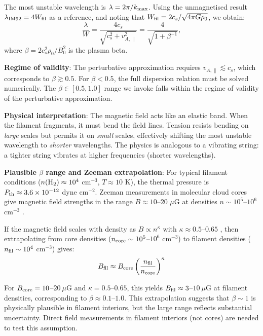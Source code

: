 \documentclass[11pt,a4paper]{article}
\begin{document}
The most unstable wavelength is $\lambda = 2\pi/k_{\rm max}$. Using the unmagnetised result $\lambda_{\rm IM92} = 4W_{\rm fil}$ as a reference, and noting that $W_{\rm fil} = 2c_s/\sqrt{4\pi G\rho_0}$, we obtain:
\begin{equation}
\frac{\lambda}{W} = \frac{4c_s}{\sqrt{c_s^2 + v_{A,\parallel}^2}} = \frac{4}{\sqrt{1 + \beta^{-1}}},
\label{eq:tension_lambda}
\end{equation}
where $\beta = 2c_s^2\rho_0/B_0^2$ is the plasma beta.

\textbf{Regime of validity}: The perturbative approximation requires $v_{A,\parallel} \lesssim c_s$, which corresponds to $\beta \gtrsim 0.5$. For $\beta < 0.5$, the full dispersion relation must be solved numerically. The $\beta \in [0.5, 1.0]$ range we invoke falls within the regime of validity of the perturbative approximation.

\textbf{Physical interpretation}: The magnetic field acts like an elastic band. When the filament fragments, it must bend the field lines. Tension resists bending on \textit{large} scales but permits it on \textit{small} scales, effectively shifting the most unstable wavelength to \textit{shorter} wavelengths. The physics is analogous to a vibrating string: a tighter string vibrates at higher frequencies (shorter wavelengths).

\textbf{Plausible $\beta$ range and Zeeman extrapolation}: For typical filament conditions ($n({\rm H_2}) \approx 10^4$ cm$^{-3}$, $T \approx 10$ K), the thermal pressure is $P_{\rm th} \approx 3.6 \times 10^{-12}$ dyne cm$^{-2}$. Zeeman measurements in molecular cloud cores give magnetic field strengths in the range $B \approx 10$--$20$ $\mu$G at densities $n \sim 10^5$--$10^6$ cm$^{-3}$ \citep{Crutcher2012}.

If the magnetic field scales with density as $B \propto n^{\kappa}$ with $\kappa \approx 0.5$--$0.65$ \citep{Crutcher2012}, then extrapolating from core densities ($n_{\rm core} \sim 10^5$--$10^6$ cm$^{-3}$) to filament densities ($n_{\rm fil} \sim 10^4$ cm$^{-3}$) gives:
\begin{equation}
B_{\rm fil} \approx B_{\rm core} \left(\frac{n_{\rm fil}}{n_{\rm core}}\right)^{\kappa}
\end{equation}

For $B_{\rm core} = 10$--$20~\mu$G and $\kappa = 0.5$--$0.65$, this yields $B_{\rm fil} \approx 3$--$10~\mu$G at filament densities, corresponding to $\beta \approx 0.1$--$1.0$. This extrapolation suggests that $\beta \sim 1$ is physically plausible in filament interiors, but the large range reflects substantial uncertainty. Direct field measurements in filament interiors (not cores) are needed to test this assumption.
\end{document}
